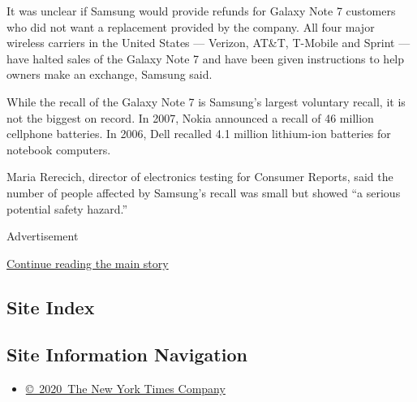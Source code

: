 It was unclear if Samsung would provide refunds for Galaxy Note 7
customers who did not want a replacement provided by the company. All
four major wireless carriers in the United States --- Verizon, AT\&T,
T-Mobile and Sprint --- have halted sales of the Galaxy Note 7 and have
been given instructions to help owners make an exchange, Samsung said.

While the recall of the Galaxy Note 7 is Samsung's largest voluntary
recall, it is not the biggest on record. In 2007, Nokia announced a
recall of 46 million cellphone batteries. In 2006, Dell recalled 4.1
million lithium-ion batteries for notebook computers.

Maria Rerecich, director of electronics testing for Consumer Reports,
said the number of people affected by Samsung's recall was small but
showed ``a serious potential safety hazard.''

Advertisement

\protect\hyperlink{after-bottom}{Continue reading the main story}

\hypertarget{site-index}{%
\subsection{Site Index}\label{site-index}}

\hypertarget{site-information-navigation}{%
\subsection{Site Information
Navigation}\label{site-information-navigation}}

\begin{itemize}
\tightlist
\item
  \href{https://help.nytimes.com/hc/en-us/articles/115014792127-Copyright-notice}{©~2020~The
  New York Times Company}
\end{itemize}

